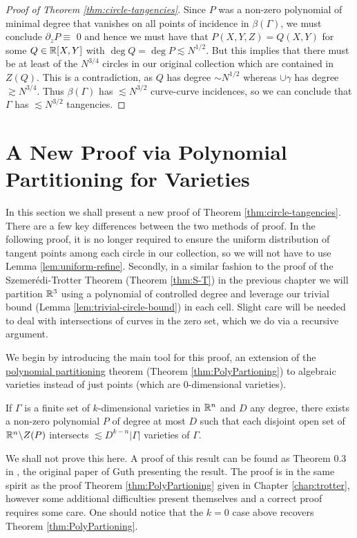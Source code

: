 \begin{proof}[Proof of Theorem \ref{thm:circle-tangencies}]
    Since $P$ was a non-zero polynomial of minimal degree that vanishes on all points of incidence in $\beta (\Gamma)$, we must conclude 
    $\partial_z P \equiv$ 0 and hence we must have that $P(X,Y,Z) = Q(X,Y)$ for some $Q \in \mathbb R[X,Y]$ with  $ \deg Q = \deg P \lesssim N^{1/2}$. 
    But this implies that there must be at least of the $N^{3/4}$ circles in our original collection which are contained in $Z(Q)$.
    This is a contradiction, as $Q$ has degree $\sim N^{1/2}$ whereas $\cup \gamma$ has degree $ \gtrsim N^{3/4}$.
    Thus $\beta(\Gamma)$ has $\lesssim N^{3/2}$ curve-curve incidences, so we can conclude that $\Gamma$ has $\lesssim N^{3/2}$ tangencies.
\end{proof}

\section[New Proof via Polynomial Partitioning]{A New Proof via Polynomial Partitioning for Varieties}
In this section we shall present a new proof of Theorem \ref{thm:circle-tangencies}. 
There are a few key differences between the two methods of proof. In the following proof, 
it is no longer required to ensure the uniform distribution of tangent points among each circle in our collection, so we will not
have to use Lemma \ref{lem:uniform-refine}.
Secondly, in a similar fashion to the proof of the Szemerédi-Trotter Theorem (Theorem \ref{thm:S-T}) in the previous chapter we will partition $\mathbb R^3$ using a polynomial of controlled degree and leverage our trivial bound (Lemma \ref{lem:trivial-circle-bound}) in each cell.
Slight care will be needed to deal with intersections of curves in the zero set, which we do via a recursive  argument.

We begin by introducing the main tool for this proof, 
an extension of the \hyperref[thm:PolyPartioning]{polynomial partitioning} theorem (Theorem \ref{thm:PolyPartioning}) to algebraic varieties instead of just points (which are 0-dimensional varieties). 

\begin{lemma}
    If $\Gamma$ is a finite set of $k$-dimensional varieties in $\mathbb R^n$ and $D$ any degree, there exists a non-zero polynomial $P$ of degree at
    most $D$ such that each disjoint open set of $\mathbb R^n \backslash Z(P)$ intersects $\lesssim D^{k-n} |\Gamma|$ varieties of $\Gamma$.\label{lem:poly-part-var}
\end{lemma}
We shall not prove this here. A proof of this result can be found as Theorem 0.3 in \cite{guth2015polypartvar}, the original paper of Guth presenting the result. The proof is in the same spirit as the proof Theorem \ref{thm:PolyPartioning} given in Chapter \ref{chap:trotter}, however some additional difficulties present themselves and a correct proof requires some care. One should notice that the $k=0$ case above recovers Theorem \ref{thm:PolyPartioning}.

